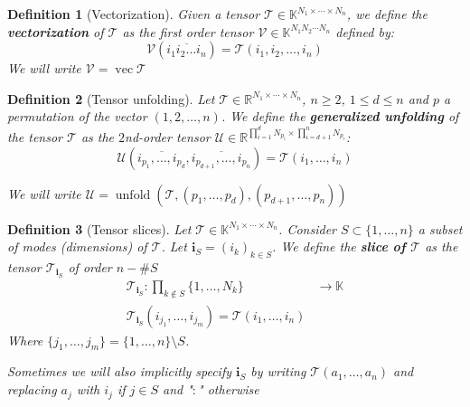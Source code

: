 \documentclass[11pt,a4paper,openright,oneside]{book}
\numberwithin{equation}{section}
\newtheorem{defn0}{Definition}[chapter]
\newenvironment{definition}{ \begin{defn0}}{\end{defn0}}
\DeclareMathOperator{\vectorize}{vec}
\DeclareMathOperator{\unfolding}{unfold}
\begin{document}
\begin{definition}[Vectorization]
    Given a tensor $\mathcal{T} \in \mathbb{K}^{N_1 \times \cdots \times N_n}$, we define the \textbf{vectorization} of $\mathcal{T}$
    as the first order tensor $\mathcal{V} \in \mathbb{K}^{N_1 N_2 \cdots N_n}$ defined by:
    $$\mathcal{V}(\overline{i_1 i_2 \dots i_n}) = \mathcal{T}(i_1, i_2, \dots, i_n)$$
    We will write $\mathcal{V} = \vectorize{\mathcal{T}}$
\end{definition}


\begin{definition}[Tensor unfolding]
Let $\mathcal{T} \in \mathbb{R}^{N_1 \times \cdots \times N_n}$, $n \geqslant 2$, $1 \leqslant d \leqslant n$ and $p$ a permutation of the vector $(1,2,\dots, n)$. We define the
\textbf{generalized unfolding} of the tensor $\mathcal{T}$ as the $2$nd-order tensor 
$\mathcal{U} \in \mathbb{R}^{\prod_{i=1}^d N_{p_i} \times \prod_{i=d+1}^n N_{p_i}}$:
$$ \mathcal{U} (\overline{i_{p_1}, \dots, i_{p_d}}, \overline{i_{p_{d+1}}, \dots, i_{p_n}}) = \mathcal{T}(i_1, \dots, i_n)$$

We will write $\mathcal{U} = \unfolding{(\mathcal{T}, (p_1, \dots, p_d), (p_{d+1}, \dots, p_n))}$
\end{definition}



\begin{definition}[Tensor slices]

    Let $\mathcal{T} \in \mathbb{K}^{N_1\times \cdots \times N_n}$. Consider $S \subset \{1, \dots, n\}$ a subset of modes (dimensions)
    of $\mathcal{T}$. Let $\mathbf{i}_S = (i_k)_{k \in S}$. We define the \textbf{slice of $\mathcal{T}$} as the tensor $\mathcal{T}_{\mathbf{i}_S}$
    of order $n - \#S$
    $$\begin{align}
        \mathcal{T}_{\mathbf{i}_S} : \prod_{k \not\in S} \{1, \dots, N_k\} & \longrightarrow \mathbb{K} \\
        \mathcal{T}_{\mathbf{i}_S}(i_{j_1}, \dots, i_{j_m}) = \mathcal{T}(i_1, \dots, i_n)
    \end{align}$$
    Where $\{j_1, \dots, j_m\} = \{1, \dots, n\} \setminus S$. 

    Sometimes we will also implicitly specify $\mathbf{i}_S$ by writing $\mathcal{T}(a_1, \dots, a_n)$ and replacing $a_j$ with $i_j$ if $j \in S$ and "$:$" otherwise

\end{definition}
\end{document}
